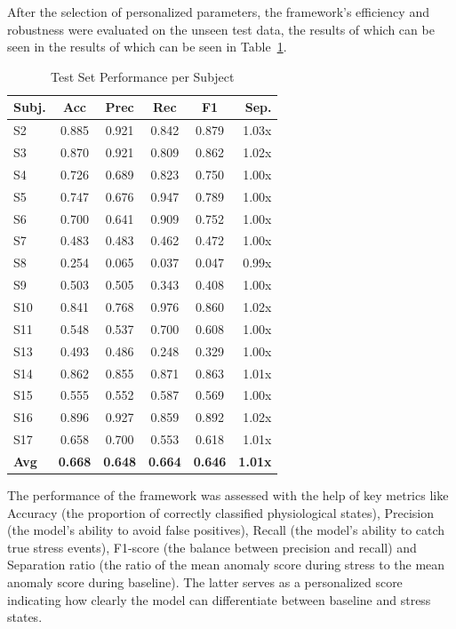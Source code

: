\documentclass[conference,10pt]{IEEEtran}
\begin{document}
After the selection of personalized parameters, the framework’s efficiency and robustness were evaluated on the unseen test data, the results of which can be seen in the results of which can be seen in Table~\ref{tab:performance_results}. 

\begin{table}[htbp]
\centering
\scriptsize
\renewcommand{\arraystretch}{0.85}
\caption{Test Set Performance per Subject}
\label{tab:performance_results}
\begin{tabular}{lccccr}
\hline
\textbf{Subj.} & \textbf{Acc} & \textbf{Prec} & \textbf{Rec} & \textbf{F1} & \textbf{Sep.} \\
\hline
S2  & 0.885 & 0.921 & 0.842 & 0.879 & 1.03x \\
S3  & 0.870 & 0.921 & 0.809 & 0.862 & 1.02x \\
S4  & 0.726 & 0.689 & 0.823 & 0.750 & 1.00x \\
S5  & 0.747 & 0.676 & 0.947 & 0.789 & 1.00x \\
S6  & 0.700 & 0.641 & 0.909 & 0.752 & 1.00x \\
S7  & 0.483 & 0.483 & 0.462 & 0.472 & 1.00x \\
S8  & 0.254 & 0.065 & 0.037 & 0.047 & 0.99x \\
S9  & 0.503 & 0.505 & 0.343 & 0.408 & 1.00x \\
S10 & 0.841 & 0.768 & 0.976 & 0.860 & 1.02x \\
S11 & 0.548 & 0.537 & 0.700 & 0.608 & 1.00x \\
S13 & 0.493 & 0.486 & 0.248 & 0.329 & 1.00x \\
S14 & 0.862 & 0.855 & 0.871 & 0.863 & 1.01x \\
S15 & 0.555 & 0.552 & 0.587 & 0.569 & 1.00x \\
S16 & 0.896 & 0.927 & 0.859 & 0.892 & 1.02x \\
S17 & 0.658 & 0.700 & 0.553 & 0.618 & 1.01x \\
\hline
\textbf{Avg} & \textbf{0.668} & \textbf{0.648} & \textbf{0.664} & \textbf{0.646} & \textbf{1.01x} \\
\hline
\end{tabular}
\end{table}


The performance of the framework was assessed with the help of key metrics like Accuracy (the proportion of correctly classified physiological states), Precision (the model’s ability to avoid false positives), Recall (the model’s ability to catch true stress events), F1-score (the balance between precision and recall) and Separation ratio (the ratio of the mean anomaly score during stress to the mean anomaly score during baseline). The latter serves as a personalized score indicating how clearly the model can differentiate between baseline and stress states.
\end{document}
